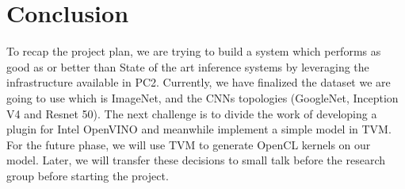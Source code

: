 \documentclass[titlepage]{report}
\begin{document}

\chapter{Conclusion}

To recap the project plan, we are trying to build a system which performs as good as or better than State of the art inference systems by leveraging the infrastructure available in PC2. Currently, we have finalized the dataset we are going to use which is ImageNet, and the CNNs topologies (GoogleNet, Inception V4 and Resnet 50). The next challenge is to divide the work of developing a plugin for Intel OpenVINO and meanwhile implement a simple model in TVM. For the future phase, we will use TVM to generate OpenCL kernels on our model. Later, we will transfer these decisions to small talk before the research group before starting the project.

\end{document}
